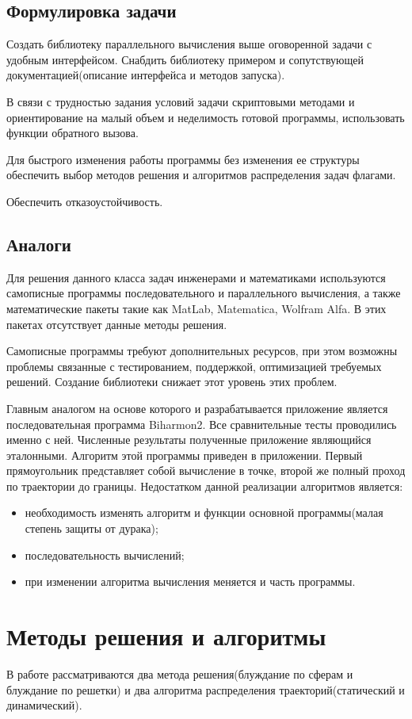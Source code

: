 \section{Формулировка задачи}
Создать библиотеку параллельного вычисления выше оговоренной задачи с удобным интерфейсом. Снабдить библиотеку примером и сопутствующей документацией(описание интерфейса и методов запуска).

В связи с трудностью задания условий задачи скриптовыми методами и ориентирование на малый объем и неделимость готовой программы, использовать функции обратного вызова.

Для быстрого изменения работы программы без изменения ее структуры обеспечить выбор методов решения и алгоритмов распределения задач флагами.

Обеспечить отказоустойчивость.
\section{Аналоги}
Для решения данного класса задач инженерами и математиками используются самописные программы последовательного и параллельного вычисления, а также математические пакеты такие как MatLab, Matematica, Wolfram Alfa. В этих пакетах отсутствует данные методы решения.

Самописные программы требуют дополнительных ресурсов, при этом возможны проблемы связанные с тестированием, поддержкой, оптимизацией требуемых решений.
Создание библиотеки снижает этот уровень этих проблем.

Главным аналогом на основе которого и разрабатывается приложение является последовательная программа Biharmon2. 
Все сравнительные тесты проводились именно с ней. Численные результаты полученные приложение являющийся эталонными.
Алгоритм этой программы приведен в приложении.  Первый прямоугольник представляет собой вычисление в точке, второй же полный проход по траектории до границы. Недостатком данной реализации алгоритмов является:
\begin{itemize}
	\item необходимость изменять алгоритм и функции основной программы(малая степень защиты от дурака);
	\item последовательность вычислений;
	\item при изменении алгоритма вычисления меняется и часть программы.
\end{itemize}
\chapter{Методы решения и алгоритмы}
В работе рассматриваются два метода решения(блуждание по сферам и блуждание по решетки) и два алгоритма распределения траекторий(статический и динамический).
